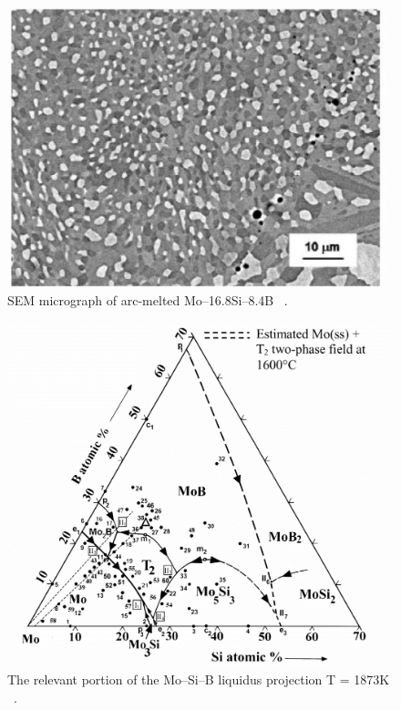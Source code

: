 %
\begin{figure}[H]
\begin{center}
\includegraphics[width=11cm]{Mo16Si8B}
\caption{SEM micrograph of arc-melted Mo--16.8Si--8.4B ~\cite{perepezko01}.}
\label{fig:Mo16Si8B}
\end{center}
\end{figure}
%
%
\begin{figure}[H]
\begin{center}
\includegraphics[width=14cm]{MoSiB_liquidus}
\vspace{-3mm}
\caption{The relevant portion of the Mo--Si--B liquidus projection T = 1873K ~\cite{perepezko01}.}\label{fig:MoSiB_liquidus}
\end{center}
\end{figure}
